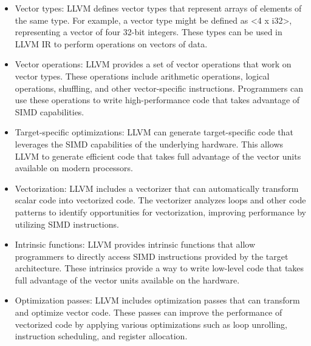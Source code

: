 \begin{itemize}

\item Vector types: LLVM defines vector types that represent arrays of
  elements of the same type. For example, a vector type might be
  defined as <4 x i32>, representing a vector of four 32-bit integers.
  These types can be used in LLVM IR to perform operations on vectors
  of data.

\item Vector operations: LLVM provides a set of vector operations that
  work on vector types. These operations include arithmetic operations,
  logical operations, shuffling, and other vector-specific
  instructions. Programmers can use these operations to write
  high-performance code that takes advantage of SIMD capabilities.

\item Target-specific optimizations: LLVM can generate target-specific
  code that leverages the SIMD capabilities of the underlying
  hardware. This allows LLVM to generate efficient code that takes
  full advantage of the vector units available on modern processors.

\item Vectorization: LLVM includes a vectorizer that can automatically
  transform scalar code into vectorized code. The vectorizer analyzes
  loops and other code patterns to identify opportunities for
  vectorization, improving performance by utilizing SIMD
  instructions.

\item Intrinsic functions: LLVM provides intrinsic functions that allow
  programmers to directly access SIMD instructions provided by the
  target architecture. These intrinsics provide a way to write
  low-level code that takes full advantage of the vector units
  available on the hardware.

\item Optimization passes: LLVM includes optimization passes that can
    transform and optimize vector code. These passes can improve the
    performance of vectorized code by applying various optimizations
    such as loop unrolling, instruction scheduling, and register
    allocation.

\end{itemize}



